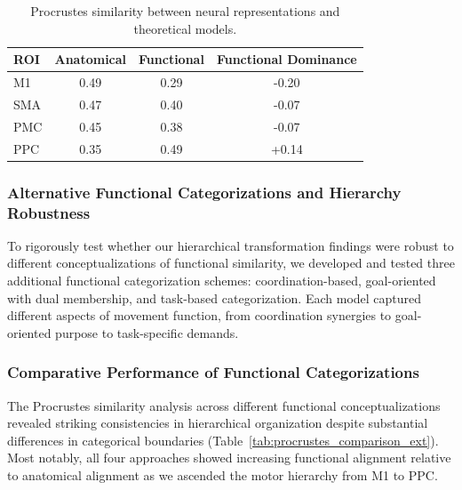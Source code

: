 \documentclass{article}
\begin{document}
\begin{table}[h]
\centering
\small
\begin{tabular}{|l|c|c|c|}
\hline
\textbf{ROI} & \textbf{Anatomical} & \textbf{Functional} & \textbf{Functional Dominance} \\
\hline
M1 & 0.49 & 0.29 & -0.20 \\
SMA & 0.47 & 0.40 & -0.07 \\
PMC & 0.45 & 0.38 & -0.07 \\
PPC & 0.35 & 0.49 & +0.14 \\
\hline
\end{tabular}
\caption{Procrustes similarity between neural representations and theoretical models.}
\label{tab:procrustes}
\end{table}

\subsubsection{Alternative Functional Categorizations and Hierarchy Robustness}

To rigorously test whether our hierarchical transformation findings were robust to different conceptualizations of functional similarity, we developed and tested three additional functional categorization schemes: coordination-based, goal-oriented with dual membership, and task-based categorization. Each model captured different aspects of movement function, from coordination synergies to goal-oriented purpose to task-specific demands.

\subsubsection{Comparative Performance of Functional Categorizations}

The Procrustes similarity analysis across different functional conceptualizations revealed striking consistencies in hierarchical organization despite substantial differences in categorical boundaries (Table~\ref{tab:procrustes_comparison_ext}). Most notably, all four approaches showed increasing functional alignment relative to anatomical alignment as we ascended the motor hierarchy from M1 to PPC.
\end{document}

